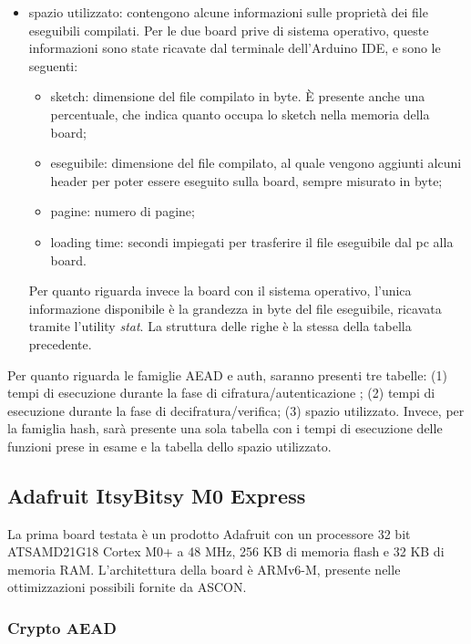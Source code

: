 \documentclass[12pt,a4paper,italian]{report}
\begin{document}
\begin{itemize}
\begin{itemize}
\begin{itemize}
            \end{itemize}
    \end{itemize}
    \item spazio utilizzato: contengono alcune informazioni sulle proprietà dei file eseguibili compilati. Per le due board prive di sistema operativo, queste informazioni sono state ricavate dal terminale dell'Arduino IDE, e sono le seguenti:
    \begin{itemize}
        \item sketch: dimensione del file compilato in byte. È presente anche una percentuale, che indica quanto occupa lo sketch nella memoria della board;
        \item eseguibile: dimensione del file compilato, al quale vengono aggiunti alcuni header per poter essere eseguito sulla board, sempre misurato in byte;
        \item pagine: numero di pagine;
        \item loading time: secondi impiegati per trasferire il file eseguibile dal pc alla board.
    \end{itemize}
    Per quanto riguarda invece la board con il sistema operativo, l'unica informazione disponibile è la grandezza in byte del file eseguibile, ricavata tramite l'utility \textit{stat}. La struttura delle righe è la stessa della tabella precedente.
\end{itemize}

\noindent Per quanto riguarda le famiglie AEAD e auth, saranno presenti tre tabelle: (1) tempi di esecuzione durante la fase di cifratura/autenticazione ; (2) tempi di esecuzione durante la fase di decifratura/verifica; (3) spazio utilizzato. Invece, per la famiglia hash, sarà presente una sola tabella con i tempi di esecuzione delle funzioni prese in esame e la tabella dello spazio utilizzato.

\subsection{Adafruit ItsyBitsy M0 Express}

La prima board testata è un prodotto Adafruit con un processore 32 bit ATSAMD21G18 Cortex M0+ a 48 MHz, 256 KB di memoria flash e 32 KB di memoria RAM\cite{adafruit}. L'architettura della board è ARMv6-M, presente nelle ottimizzazioni possibili fornite da ASCON\cite{arm}.

\subsubsection{Crypto AEAD}
\end{document}
